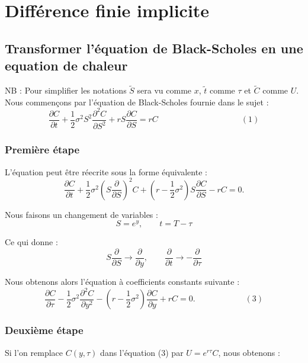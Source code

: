 \documentclass[a4paper, 12pt]{article}
\begin{document}
\newpage
\section{Différence finie implicite}
\subsection{Transformer l'équation de Black-Scholes en une equation de chaleur}
NB : Pour simplifier les notations $\widetilde{S}$ sera vu comme $x$, $\widetilde{t}$ comme $\tau$ et $\widetilde{C}$ comme $U$.
Nous commençons par l'équation de Black-Scholes fournie dans le sujet :\\

$$\frac{\partial C}{\partial t}+\frac{1}{2}\sigma^2S^2\frac{\partial^2 C}{\partial S^2}+ rS\frac{\partial C}{\partial S}=rC\qquad\qquad\qquad\qquad\qquad(1)$$

\subsubsection{Première étape}
L'équation peut être réecrite sous la forme équivalente :\\

$$\frac{\partial C}{\partial t}+\frac{1}{2}\sigma^2\left(S\frac{\partial }{\partial S}\right)^2C+\left(r-\frac{1}{2}\sigma^2\right)S\frac{\partial C}{\partial S}-rC=0.$$

Nous faisons un changement de variables :\\

$$S=e^y,\qquad t=T-\tau$$

Ce qui donne :\\

$$S\frac{\partial }{\partial S}\to\frac{\partial}{\partial y},\qquad \frac{\partial}{\partial t}\to - \frac{\partial}{\partial \tau}$$

Nous obtenons alors l'équation à coefficients constants suivante :\\

$$\frac{\partial C}{\partial \tau}-\frac{1}{2}\sigma^2\frac{\partial^2 C}{\partial y^2}-\left(r-\frac{1}{2}\sigma^2\right)\frac{\partial C}{\partial y}+rC=0.\qquad\qquad\qquad(3)$$

\subsubsection{Deuxième étape}
Si l'on remplace $C(y,\tau)$ dans l'équation (3) par  $U=e^{r\tau}C$, nous obtenons :\\
\end{document}
